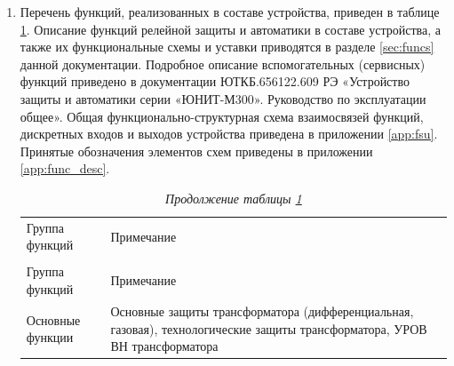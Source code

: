 \begin{enumerate}

\item
Перечень функций, реализованных в составе устройства, приведен в таблице \ref{desc:tbl1}. Описание функций релейной защиты и автоматики в составе устройства, а также их функциональные схемы и уставки приводятся в разделе \ref{sec:funcs} данной документации. Подробное описание вспомогательных (сервисных) функций приведено в документации ЮТКБ.656122.609 РЭ «Устройство защиты и автоматики серии «ЮНИТ-М300». Руководство по эксплуатации общее». Общая функционально-структурная схема взаимосвязей функций, дискретных входов и выходов устройства приведена в приложении \ref{app:fsu}. Принятые обозначения элементов схем приведены в приложении \ref{app:func_desc}.

\small
\setlength{\extrarowheight}{0.05cm} %
\begin{longtable}
{|>{\centering\arraybackslash}m{3.2cm}|>{\centering\arraybackslash}m{13.7cm}|}
\caption{Функции в составе устройства «ЮНИТ-М300-ДЗТ2»\hfill\vspace{-0.5\baselineskip}}\label{desc:tbl1}\\ 
\hhline{|-|-|}
\rowcolor{gray!30}
Группа функций & Примечание \\ 
\hhline{|-|-|}
\endfirsthead

\caption*{\hspace{3pt}\emph{Продолжение таблицы \ref{desc:tbl1}\hfill\vspace{-0.5\baselineskip}}} \\ %
\hhline{|-|-|}
\rowcolor{gray!30}
Группа функций & Примечание \\ 
\hhline{|-|-|}
\endhead
\hhline{|-|-|}

\endfoot
\endlastfoot

\centering Основные функции & \flushleft\arraybackslash Основные защиты трансформатора (дифференциальная, газовая), технологические защиты трансформатора, УРОВ ВН трансформатора  \\  \hline


\end{longtable}
\end{enumerate}
